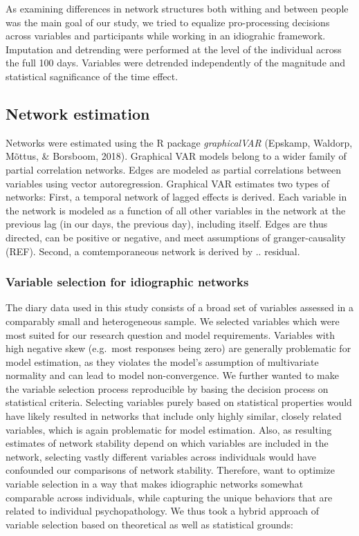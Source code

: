\documentclass[
  english,
  man]{apa6}
\begin{document}
As examining differences in network structures both withing and between people was the main goal of our study, we tried to equalize pro-processing decisions across variables and participants while working in an idiograhic framework.
Imputation and detrending were performed at the level of the individual across the full 100 days.
Variables were detrended independently of the magnitude and statistical sagnificance of the time effect.

\hypertarget{network-estimation}{%
\subsection{Network estimation}\label{network-estimation}}

Networks were estimated using the R package \emph{graphicalVAR} (Epskamp, Waldorp, Mõttus, \& Borsboom, 2018).
Graphical VAR models belong to a wider family of partial correlation networks.
Edges are modeled as partial correlations between variables using vector autoregression.
Graphical VAR estimates two types of networks: First, a temporal network of lagged effects is derived.
Each variable in the network is modeled as a function of all other variables in the network at the previous lag (in our days, the previous day), including itself.
Edges are thus directed, can be positive or negative, and meet assumptions of granger-causality (REF).
Second, a comtemporaneous network is derived by ..
residual.

\hypertarget{variable-selection-for-idiographic-networks}{%
\subsubsection{Variable selection for idiographic networks}\label{variable-selection-for-idiographic-networks}}

The diary data used in this study consists of a broad set of variables assessed in a comparably small and heterogeneous sample.
We selected variables which were most suited for our research question and model requirements.
Variables with high negative skew (e.g.~most responses being zero) are generally problematic for model estimation, as they violates the model's assumption of multivariate normality and can lead to model non-convergence.
We further wanted to make the variable selection process reproducible by basing the decision process on statistical criteria.
Selecting variables purely based on statistical properties would have likely resulted in networks that include only highly similar, closely related variables, which is again problematic for model estimation.
Also, as resulting estimates of network stability depend on which variables are included in the network, selecting vastly different variables across individuals would have confounded our comparisons of network stability.
Therefore, want to optimize variable selection in a way that makes idiographic networks somewhat comparable across individuals, while capturing the unique behaviors that are related to individual psychopathology.
We thus took a hybrid approach of variable selection based on theoretical as well as statistical grounds:
\end{document}
